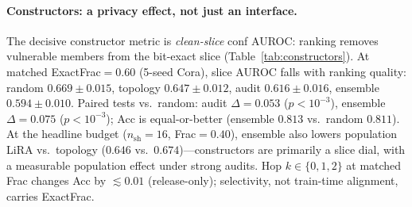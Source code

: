 \documentclass[conference]{IEEEtran}
\begin{document}
\paragraph{Constructors: a privacy effect, not just an interface.}
The decisive constructor metric is \emph{clean-slice} conf AUROC: ranking removes vulnerable members from the bit-exact slice (Table~\ref{tab:constructors}).
At matched ExactFrac${=}0.60$ (5-seed Cora), slice AUROC falls with ranking quality: random $0.669{\pm}0.015$, topology $0.647{\pm}0.012$, audit $0.616{\pm}0.016$, ensemble $0.594{\pm}0.010$.
Paired tests vs.\ random: audit $\Delta{=}0.053$ ($p{<}10^{-3}$), ensemble $\Delta{=}0.075$ ($p{<}10^{-3}$); Acc is equal-or-better (ensemble $0.813$ vs.\ random $0.811$).
At the headline budget ($n_{\mathrm{sh}}{=}16$, Frac${=}0.40$), ensemble also lowers population LiRA vs.\ topology ($0.646$ vs.\ $0.674$)---constructors are primarily a slice dial, with a measurable population effect under strong audits.
Hop $k{\in}\{0,1,2\}$ at matched Frac changes Acc by ${\lesssim}0.01$ (release-only); selectivity, not train-time alignment, carries ExactFrac.

\begin{table}[!t]
\caption{Release-only constructors at Frac${=}0.40$ (Cora, 5 seeds; mean$\pm$1.96\,SE).
Slice $=$ clean-slice conf AUROC. LiRA here $n_{\mathrm{sh}}{=}4$; headline is Table~\ref{tab:fair}.}
\label{tab:constructors}
\centering
{}
\end{table}
\end{document}
